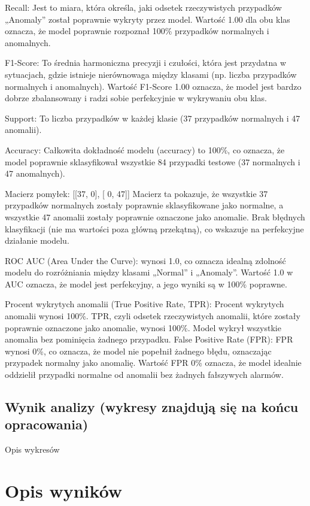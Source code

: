 \documentclass[a4paper,fleqn]{cas-dc}
\begin{document}
Recall: Jest to miara, która określa, jaki odsetek rzeczywistych przypadków „Anomaly” został poprawnie wykryty przez model. Wartość 1.00 dla obu klas oznacza, że model poprawnie rozpoznał 100\% przypadków normalnych i anomalnych.

F1-Score: To średnia harmoniczna precyzji i czułości, która jest przydatna w sytuacjach, gdzie istnieje nierównowaga między klasami (np. liczba przypadków normalnych i anomalnych). Wartość F1-Score 1.00 oznacza, że model jest bardzo dobrze zbalansowany i radzi sobie perfekcyjnie w wykrywaniu obu klas.

Support: To liczba przypadków w każdej klasie (37 przypadków normalnych i 47 anomalii).

Accuracy: Całkowita dokładność modelu (accuracy) to 100\%, co oznacza, że model poprawnie sklasyfikował wszystkie 84 przypadki testowe (37 normalnych i 47 anomalnych).

Macierz pomyłek:
[[37, 0],
 [ 0, 47]]
Macierz ta pokazuje, że wszystkie 37 przypadków normalnych zostały poprawnie sklasyfikowane jako normalne, a wszystkie 47 anomalii zostały poprawnie oznaczone jako anomalie. Brak błędnych klasyfikacji (nie ma wartości poza główną przekątną), co wskazuje na perfekcyjne działanie modelu.

ROC AUC (Area Under the Curve):  wynosi 1.0, co oznacza idealną zdolność modelu do rozróżniania między klasami „Normal” i „Anomaly”. Wartość 1.0 w AUC oznacza, że model jest perfekcyjny, a jego wyniki są w 100\% poprawne.

Procent wykrytych anomalii (True Positive Rate, TPR): Procent wykrytych anomalii wynosi 100\%. TPR, czyli odsetek rzeczywistych anomalii, które zostały poprawnie oznaczone jako anomalie, wynosi 100\%. Model wykrył wszystkie anomalia bez pominięcia żadnego przypadku.
False Positive Rate (FPR): FPR wynosi 0\%, co oznacza, że model nie popełnił żadnego błędu, oznaczając przypadek normalny jako anomalię. Wartość FPR 0\% oznacza, że model idealnie oddzielił przypadki normalne od anomalii bez żadnych fałszywych alarmów.


\subsection{Wynik analizy (wykresy znajdują się na końcu opracowania)}

Opis wykresów

\section{Opis wyników}
\end{document}
